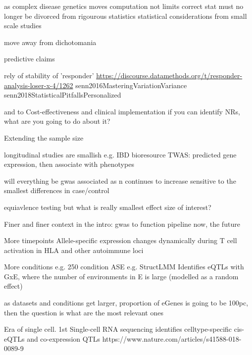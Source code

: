 \begin{outline}
    as     complex disease genetics moves 
    computation not limits correct stat
    must no longer be divorced from rigourous statistics
        statistical considerations from small scale studies

    move away from dichotomania

        predictive claims

            rely of stability of 'responder'
                \url{https://discourse.datamethods.org/t/responder-analysis-loser-x-4/1262}
                senn2016MasteringVariationVariance
                senn2018StatisticalPitfallsPersonalized

        and to Cost-effectiveness and clinical implementation
            if you can identify NRs, what are you going to do about it?

Extending the sample size

    longitudinal studies are smallish
    e.g. IBD bioresource
        TWAS: predicted gene expression, then associate with phenotypes

    will everything be gwas associated as n continues to increase
    sensitive to the smallest differences in case/control
    
    equiavlence testing
        but what is really smallest effect size of interest?

Finer and finer context
    in the intro: gwas to function pipeline
    now, the future

    More timepoints
    Allele-specific expression changes dynamically during T cell activation in HLA and other autoimmune loci

    More conditions
    e.g. 250 condition ASE %
    e.g. StructLMM 
        Identifies eQTLs with GxE, where the number of environments in E is large (modelled as a random effect)

    as datasets and conditions get larger, proportion of eGenes is going to be 100pc, then the question is what are the most relevant ones

    Era of single cell.
        1st
        Single-cell RNA sequencing identifies celltype-specific cis-eQTLs and co-expression QTLs
        https://www.nature.com/articles/s41588-018-0089-9


\end{outline}
